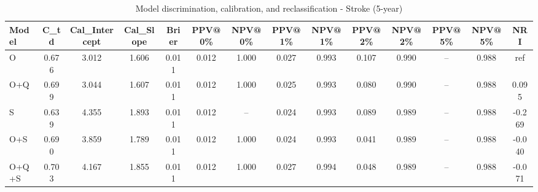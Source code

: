 \begin{table}[htbp]
\centering
\small
\caption{Model discrimination, calibration, and reclassification - Stroke (5-year)}
\label{tab:perf_stroke_5y}
\begin{tabular}{lccccccccccccc}
\toprule
Model & C\_td & Cal\_Intercept & Cal\_Slope & Brier & PPV@0\% & NPV@0\% & PPV@1\% & NPV@1\% & PPV@2\% & NPV@2\% & PPV@5\% & NPV@5\% & NRI \\
\midrule
O & 0.676 & 3.012 & 1.606 & 0.011 & 0.012 & 1.000 & 0.027 & 0.993 & 0.107 & 0.990 & -- & 0.988 & ref \\
O+Q & 0.699 & 3.044 & 1.607 & 0.011 & 0.012 & 1.000 & 0.025 & 0.993 & 0.080 & 0.990 & -- & 0.988 & 0.095 \\
S & 0.639 & 4.355 & 1.893 & 0.011 & 0.012 & -- & 0.024 & 0.993 & 0.089 & 0.989 & -- & 0.988 & -0.269 \\
O+S & 0.690 & 3.859 & 1.789 & 0.011 & 0.012 & 1.000 & 0.024 & 0.993 & 0.041 & 0.989 & -- & 0.988 & -0.040 \\
O+Q+S & 0.703 & 4.167 & 1.855 & 0.011 & 0.012 & 1.000 & 0.027 & 0.994 & 0.048 & 0.989 & -- & 0.988 & -0.071 \\
\bottomrule
\end{tabular}
\end{table}